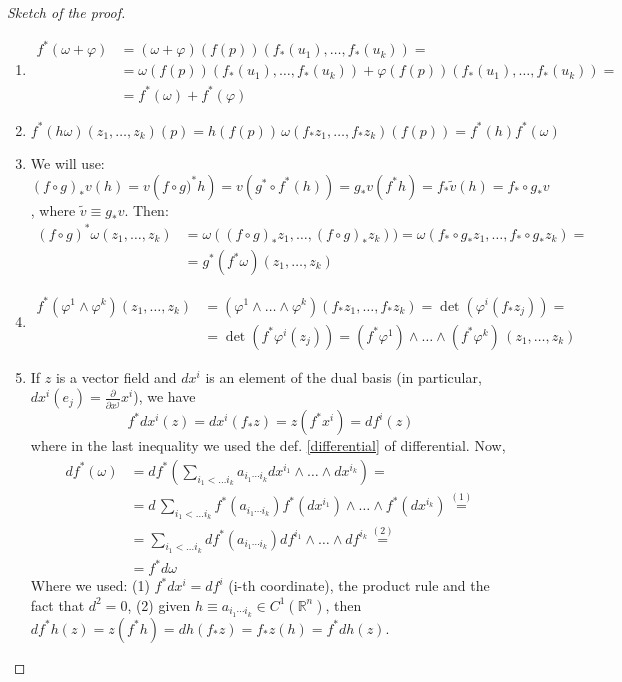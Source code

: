 \documentclass[a4paper,11pt,titlepage, article, oneside]{memoir}
\numberwithin{equation}{section}
\theoremstyle{definition}
\theoremstyle{remark}
\newcommand{\rfield}{\mathbb{R}}
\begin{document}
\begin{proof}[Sketch of the proof]
$ $
\begin{enumerate}
\item \begin{align*}
f^*(\omega + \varphi) &= (\omega + \varphi)(f(p)) (f_*(u_1), \ldots, f_*(u_k)) =\\
& = \omega(f(p)) (f_*(u_1), \ldots, f_*(u_k)) + \varphi(f(p)) (f_*(u_1), \ldots, f_*(u_k)) = \\
&=  f^*(\omega) + f^*(\varphi)
\end{align*} 
\item $f^*(h \omega) (z_1, \ldots, z_k)(p) = h(f(p))\, \omega (f_* z_1, \ldots, f_* z_k) (f(p)) = f^*(h)f^*(\omega)$
\item We will use: $(f \circ g)_* v(h) = v \left(f \circ g)^* h \right) = v(g^* \circ f^*(h)) = g_*v(f^*h) = f_* \tilde v (h) = f_* \circ g_* v$, where $\tilde v \equiv g_* v$. Then:
\begin{align*}
(f \circ g)^* \omega(z_1, \ldots, z_k) &= \omega ((f \circ g)_* z_1, \ldots, (f \circ g)_* z_k)) = \omega(f_* \circ g_* z_1, \ldots, f_* \circ g_* z_k) = \\ &= g^*(f^* \omega)(z_1, \ldots, z_k)
\end{align*}
\item \begin{align*}
f^*(\varphi^1 \wedge \varphi^k)(z_1, \ldots, z_k) &= (\varphi^1 \wedge \ldots \wedge \varphi^k)(f_* z_1, \ldots, f_*z_k) = \det\left( \varphi^i (f_* z_j)\right) = \\
&= \det \left( f^* \varphi^i(z_j) \right) = (f^* \varphi^1)\wedge \ldots \wedge (f^* \varphi^k) \, (z_1, \ldots, z_k)
\end{align*}
\item If $z$ is a vector field and $dx^i$ is an element of the dual basis (in particular, $dx^i(e_j) = \frac{\partial}{\partial x^j} x^i$), we have
$$f^*dx^i(z) = dx^i(f_* z) = z(f^*x^i) = df^i(z)$$
where in the last inequality we used the def. \ref{differential} of differential.
Now, 
\begin{align*}
df^*(\omega) &= df^* \left(\sum\limits_{i_1 < \ldots i_k} a_{i_1 \cdots i_k} dx^{i_1} \wedge \ldots \wedge dx^{i_k} \right) = \\
&= d \, \sum\limits_{i_1 < \ldots i_k} f^* (a_{i_1 \cdots i_k}) f^*(dx^{i_1}) \wedge \ldots \wedge f^*(dx^{i_k}) \overset{(1)}{=} \\
&=\sum\limits_{i_1 < \ldots i_k} df^*(a_{i_1 \cdots i_k}) df^{i_1} \wedge \ldots \wedge df^{i_k} \overset{(2)}{=} \\
&= f^* d \omega
\end{align*}
Where we used: (1) $f^*dx^i = df^i$ (i-th coordinate), the product rule and the fact that $d^2 = 0$, (2) given $h \equiv a_{i_1 \cdots i_k} \in C^1(\rfield^n)$, then $df^* h(z) = z(f^*h) = dh(f_* z) = f_*z(h) = f^*dh(z)$.
\end{enumerate}
\end{proof}
\end{document}
